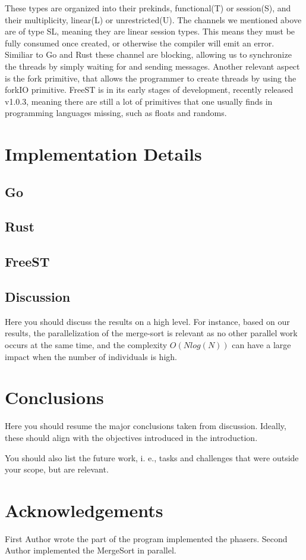 \documentclass[runningheads]{llncs}
\begin{document}
These types are organized into their prekinds, functional(T) or session(S), and their multiplicity, linear(L) or unrestricted(U).
The channels we mentioned above are of type SL, meaning they are linear session types. This means they must be fully consumed once created, or otherwise the compiler will emit an error.
Similiar to Go and Rust these channel are blocking, allowing us to synchronize the threads by simply waiting for and sending messages.
Another relevant aspect is the fork primitive, that allows the programmer to create threads by using the forkIO primitive.
FreeST is in its early stages of development, recently released v1.0.3, meaning there are still a lot of primitives that one usually finds in programming languages missing, such as floats and randoms.
\section{Implementation Details}
\lipsum[1]
\subsection{Go}
\lipsum[1]
\subsection{Rust}
\lipsum[1]
\subsection{FreeST}
\lipsum[1]
\subsection{Discussion}
Here you should discuss the results on a high level. For instance, based on our results, the parallelization of the merge-sort is relevant as no other parallel work occurs at the same time, and the complexity $O(N log(N))$ can have a large impact when the number of individuals is high.
\section{Conclusions}
Here you should resume the major conclusions taken from discussion. Ideally, these should align with the objectives introduced in the introduction.


You should also list the future work, i. e., tasks and challenges that were outside your scope, but are relevant.
\section*{Acknowledgements}
First Author wrote the part of the program implemented the phasers. Second Author implemented the MergeSort in parallel. 
\end{document}
